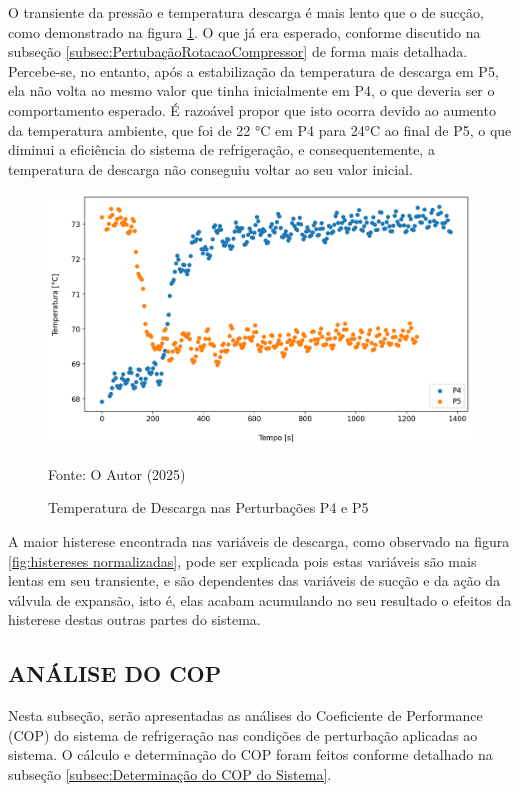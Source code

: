 O transiente da pressão e temperatura descarga é mais lento que o de sucção, como demonstrado na figura \ref{fig:TempDescargaSubidaeDescida}. O que já era esperado, conforme discutido na subseção \ref{subsec:PertubaçãoRotacaoCompressor} de forma mais detalhada.
Percebe-se, no entanto, após a estabilização da temperatura de descarga em P5, ela não volta ao mesmo valor que tinha inicialmente em P4, o que deveria ser o comportamento esperado. É razoável propor que isto ocorra devido ao aumento da temperatura ambiente, que foi de 22 °C em P4 para 24°C ao final de P5, o que diminui a eficiência do sistema de refrigeração, e consequentemente, a temperatura de descarga não conseguiu voltar ao seu valor inicial.
\newpage
\begin{figure}[h]
    \centering
    \includegraphics[width=1\linewidth]{FigurasdoTexto/Temperatura de Descarga.png}
    \caption{Temperatura de Descarga  nas Perturbações P4 e P5}
    \label{fig:TempDescargaSubidaeDescida}
    {\footnotesize Fonte: O Autor (2025)}
\end{figure}

A maior histerese encontrada nas variáveis de descarga, como observado na figura \ref{fig:histereses normalizadas}, pode ser explicada pois estas variáveis são mais lentas em seu transiente, e são dependentes das variáveis de sucção e da ação da válvula de expansão, isto é, elas acabam acumulando no seu resultado o efeitos da histerese destas outras partes do sistema. 

\subsection{\MakeUppercase{Análise do COP}}

Nesta subseção, serão apresentadas as análises do Coeficiente de Performance (COP) do sistema de refrigeração nas condições de perturbação aplicadas ao sistema. O cálculo e determinação do COP foram feitos conforme detalhado na subseção \ref{subsec:Determinação do COP do Sistema}.

